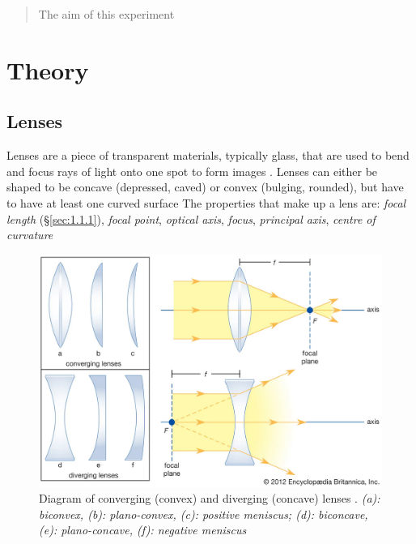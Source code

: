 \documentclass[12pt]{article}
\begin{document}
\setcounter{page}{1}
\tableofcontents

\newpage

\begin{abstract}

\vspace{1cm}

The aim of this experiment 

\end{abstract}


\section{Theory} \label{sec:1}

\subsection{Lenses} \label{sec:1.1}

Lenses are a piece of transparent materials, typically glass, that are used to bend and focus rays of light onto one spot to form images
\cite{britlens,vedantulens}.
Lenses can either be shaped to be concave (depressed, caved) or convex (bulging, rounded), but have to have at least one curved surface
\cite{britlens,vedantulens}
The properties that make up a lens are: \textit{focal length} (§\ref{sec:1.1.1}), \textit{focal point}, \textit{optical axis}, \textit{focus}, \textit{principal axis}, \textit{centre of curvature}
\cite{geekconcave,geekconvex}

\begin{figure}[H]
    \centering
    \includegraphics[width=15cm]{lenses.png}
    \caption{\centering Diagram of converging (convex) and diverging (concave) lenses \protect\cite{britlens}.
    \newline
    \centering \scriptsize{\textit{(a): biconvex, (b): plano-convex, (c): positive meniscus; (d): biconcave, (e): plano-concave, (f): negative meniscus}}}
    \label{fig:lens}
\end{figure}
\end{document}
